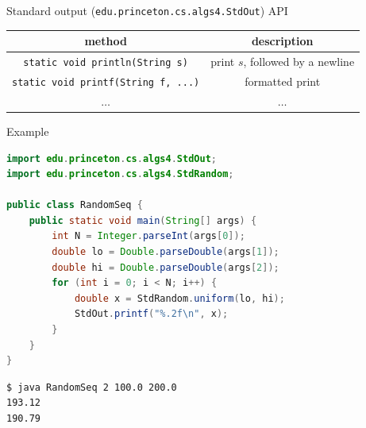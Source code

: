 \documentclass[8pt,a4paper,compress]{beamer}
\begin{document}
\begin{frame}[fragile]
\pause

Standard output (\lstinline{edu.princeton.cs.algs4.StdOut}) API
\begin{center}
\begin{tabular}{cc}
method & description \\ \hline
\lstinline$static void println(String s)$ & print $s$, followed by a newline \\
\lstinline$static void printf(String f, ...)$ & formatted print \\
$\dots$ & $\dots$ 
\end{tabular} 
\end{center}

\pause
\bigskip

Example
\begin{lstlisting}[language=Java]
import edu.princeton.cs.algs4.StdOut;
import edu.princeton.cs.algs4.StdRandom;

public class RandomSeq {
    public static void main(String[] args) { 
        int N = Integer.parseInt(args[0]);
        double lo = Double.parseDouble(args[1]);
        double hi = Double.parseDouble(args[2]);
        for (int i = 0; i < N; i++) {
            double x = StdRandom.uniform(lo, hi);
            StdOut.printf("%.2f\n", x);
        }
    }
}
\end{lstlisting}

\pause

\begin{lstlisting}[language={}]
$ java RandomSeq 2 100.0 200.0
193.12
190.79
\end{lstlisting}
\end{frame}
\end{document}
